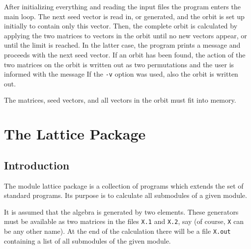 After initializing everything and reading the input files the program
enters the main loop. The next seed vector is read in, or generated,
and the orbit is set up initially to contain only this vector.
Then, the complete orbit is calculated by applying the two
matrices to vectors in the orbit until no new vectors appear,
or until the limit is reached. In the latter case, the program
prints a message
and proceeds with the next seed vector.
If an orbit has been found,
the action of the two matrices on the orbit is written out as
two permutations and the user is informed with the message
If the {\tt -v} option was used, also the orbit is written out.


\Limits
The matrices, seed vectors, and all vectors in the orbit must fit
into memory.


 
\section{The Lattice Package} \label{sec:lattice}

\subsection{Introduction}
The {\MeatAxe} module lattice package is a collection of programs
which extends the set of standard {\MeatAxe} programs. Its purpose
is to calculate all submodules of a given module. 

It is assumed that the algebra is generated by two elements. These
generators must be available as two matrices in the files {\tt X.1}
and {\tt X.2}, say (of course, {\tt X} can be any other name). At the
end of the calculation there will be a file {\tt X.out} containing a
list of all submodules of the given module.

